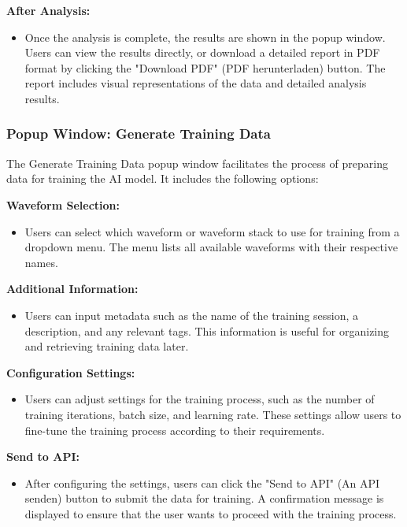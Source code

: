 \documentclass[]{scrreprt}
\begin{document}
\textbf{After Analysis:}
\begin{itemize}
    \item Once the analysis is complete, the results are shown in the popup window. Users can view the results directly, or download a detailed report in PDF format by clicking the "Download PDF" (PDF herunterladen) button. The report includes visual representations of the data and detailed analysis results.
\end{itemize}

\subsubsection{Popup Window: Generate Training Data}\label{cap:PopupWindow_generate_training_data}

The Generate Training Data popup window facilitates the process of preparing data for training the AI model. It includes the following options:

\textbf{Waveform Selection:}
\begin{itemize}
    \item Users can select which waveform or waveform stack to use for training from a dropdown menu. The menu lists all available waveforms with their respective names.
\end{itemize}

\textbf{Additional Information:}
\begin{itemize}
    \item Users can input metadata such as the name of the training session, a description, and any relevant tags. This information is useful for organizing and retrieving training data later.
\end{itemize}

\textbf{Configuration Settings:}
\begin{itemize}
    \item Users can adjust settings for the training process, such as the number of training iterations, batch size, and learning rate. These settings allow users to fine-tune the training process according to their requirements.
\end{itemize}

\textbf{Send to API:}
\begin{itemize}
    \item After configuring the settings, users can click the "Send to API" (An API senden) button to submit the data for training. A confirmation message is displayed to ensure that the user wants to proceed with the training process.
\end{itemize}
\end{document}
